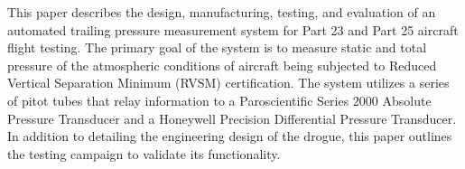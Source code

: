 This paper describes the design, manufacturing, testing, and evaluation of an automated trailing pressure measurement system for Part 23 and Part 25 aircraft flight testing. The primary goal of the system  is to measure static and total pressure of the atmospheric conditions of aircraft being subjected to Reduced Vertical Separation Minimum (RVSM) certification. The system utilizes a series of pitot tubes that relay information to a Paroscientific Series 2000 Absolute Pressure Transducer and a Honeywell Precision Differential Pressure Transducer. In addition to detailing the engineering design of the drogue, this paper outlines the testing campaign to validate its functionality.